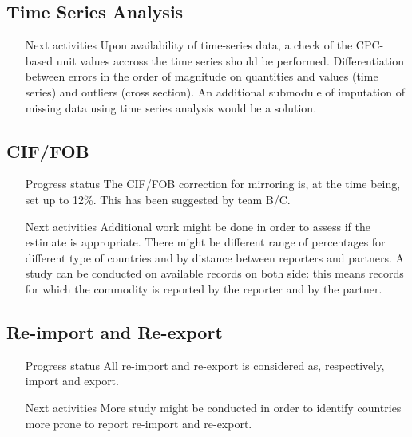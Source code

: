 \documentclass[nojss]{jss}\usepackage[]{graphicx}\usepackage[]{color}
\begin{document}
\subsection{Time Series Analysis}
\begin{itemize}
\item[Next activities] Upon availability of time-series data, a check of the CPC-based unit values accross the time series should be performed. Differentiation between errors in the order of magnitude on quantities and values (time series) and outliers (cross section). An additional submodule of imputation of missing data using time series analysis would be a solution.
\end{itemize}


\subsection{CIF/FOB}
\begin{itemize}
\item[Progress status] The CIF/FOB correction for mirroring is, at the time being, set up to 12\%. This has been suggested by team B/C.
\item[Next activities] Additional work might be done in order to assess if the estimate is appropriate. There might be different range of percentages for different type of countries and by distance between reporters and partners. A study can be conducted on available records on both side: this means records for which the commodity is reported by the reporter and by the partner.
\end{itemize}

\subsection{Re-import and Re-export}
\begin{itemize}
\item[Progress status] All re-import and re-export is considered as, respectively, import and export.
\item[Next activities] More study might be conducted in order to identify countries more prone to report re-import and re-export.
\end{itemize}
\end{document}
